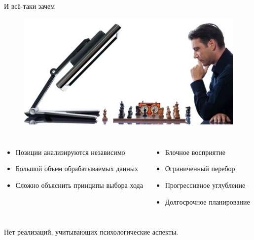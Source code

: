 
\begin{frame}{И всё-таки зачем}
\begin{figure}
\includegraphics[scale=0.55]{./pictures/vs.png}
\end{figure}
\begin{columns}
\begin{itemize}
\item Позиции анализируются независимо
\item Большой объем обрабатываемых данных
\item Сложно объяснить принципы выбора хода
\end{itemize}
\begin{itemize}
\item Блочное восприятие
\item Ограниченный перебор
\item Прогрессивное углубление
\item Долгосрочное планирование
\end{itemize}
\end{columns}

\smallskip
Нет реализаций, учитывающих психологические аспекты.
\end{frame}

\endinput

\begin{frame}{Зачем этим нужно заниматься?} 
\begin{itemize}
\item Шахматы, как игра с полной информацией, сводится к решению задачи комбинаторной оптимизации.
\item Человек способен эффективно решать подобные задачи неформальным способом.
\item Существующие игровые программы основываются на иных методах решения.
\item В точности определить подход, используемый человеком, на данный момент не удалось.
\end{itemize}
\end{frame}


